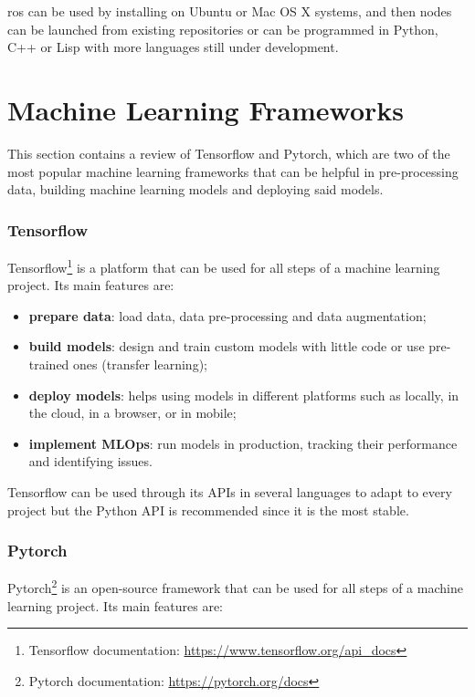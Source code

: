 \acs{ros} can be used by installing on Ubuntu or Mac OS X systems, and then nodes can be launched from existing repositories or can be programmed in Python, C++ or Lisp with more languages still under development.

\section{Machine Learning Frameworks}

This section contains a review of Tensorflow and Pytorch, which are two of the most popular machine learning frameworks that can be helpful in pre-processing data, building machine learning models and deploying said models.

\subsubsection{Tensorflow}

Tensorflow\footnote{Tensorflow documentation: \url{https://www.tensorflow.org/api_docs}} is a platform that can be used for all steps of a machine learning project. Its main features are:
\begin{itemize}
    \item \textbf{prepare data}: load data, data pre-processing and data augmentation;
    \item \textbf{build models}: design and train custom models with little code or use pre-trained ones (transfer learning);
    \item \textbf{deploy models}: helps using models in different platforms such as locally, in the cloud, in a browser, or in mobile;
    \item \textbf{implement MLOps}: run models in production, tracking their performance and identifying issues.
\end{itemize}

Tensorflow can be used through its APIs in several languages to adapt to every project but the Python API is recommended since it is the most stable.

\subsubsection{Pytorch}

Pytorch\footnote{Pytorch documentation: \url{https://pytorch.org/docs}} is an open-source framework that can be used for all steps of a machine learning project. Its main features are:

